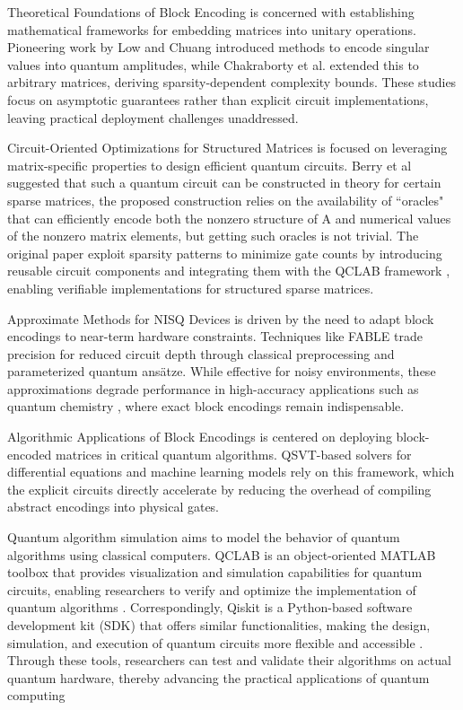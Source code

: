 \documentclass{article}
\begin{document}
    \label{sec:related_works}

    Theoretical Foundations of Block Encoding is concerned with establishing mathematical frameworks for embedding matrices into unitary operations. Pioneering work by Low and Chuang\cite{low2017optimal}
    introduced methods to encode singular values into quantum amplitudes, while Chakraborty et al.\cite{chakraborty2018power}
    extended this to arbitrary matrices, deriving sparsity-dependent complexity bounds. These studies focus on asymptotic guarantees rather than explicit circuit implementations, leaving practical deployment challenges unaddressed.

    Circuit-Oriented Optimizations for Structured Matrices is focused on leveraging matrix-specific properties to design efficient quantum circuits.
    Berry et al \cite{berry2015hamiltonian} suggested that such a quantum circuit can
    be constructed in theory for certain sparse matrices, the proposed construction relies on the availability of “oracles" that
    can efficiently encode both the nonzero structure of A and numerical values of the nonzero matrix elements, but getting such oracles is not trivial.
    The original paper exploit sparsity patterns to minimize gate counts by introducing reusable circuit components and integrating them with the QCLAB framework
    , enabling verifiable implementations for structured sparse matrices.

    Approximate Methods for NISQ Devices is driven by the need to adapt block encodings to near-term hardware constraints. Techniques like FABLE \cite{camps2022fable}
    trade precision for reduced circuit depth through classical preprocessing and parameterized quantum ansätze. While effective for noisy environments, these approximations degrade performance in high-accuracy applications such as quantum chemistry
    , where exact block encodings remain indispensable.

    Algorithmic Applications of Block Encodings is centered on deploying block-encoded matrices in critical quantum algorithms. QSVT-based solvers \cite{Gilyen2019}for differential equations
    and machine learning models rely on this framework, which the explicit circuits directly accelerate by reducing the overhead of compiling abstract encodings into physical gates.


    Quantum algorithm simulation aims to model the behavior of quantum algorithms using classical computers.
    QCLAB \cite{keip2025qclab} is an object-oriented MATLAB toolbox that provides visualization and simulation capabilities for quantum circuits, enabling researchers to verify and optimize the implementation of quantum algorithms .
    Correspondingly, Qiskit\cite{wille2019ibm} is a Python-based software development kit (SDK) that offers similar functionalities, making the design, simulation, and execution of quantum circuits more flexible and accessible .
    Through these tools, researchers can test and validate their algorithms on actual quantum hardware, thereby advancing the practical applications of quantum computing
\end{document}
